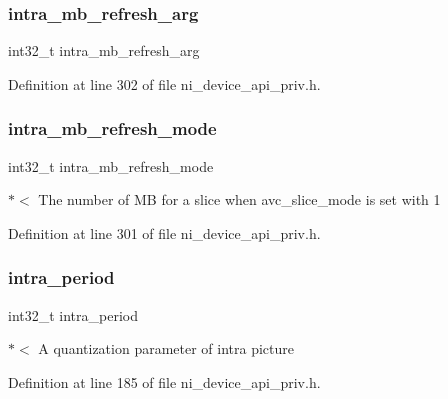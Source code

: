\subsubsection{\texorpdfstring{intra\_mb\_refresh\_arg}{intra\_mb\_refresh\_arg}}
{\footnotesize\ttfamily int32\+\_\+t intra\+\_\+mb\+\_\+refresh\+\_\+arg}



Definition at line 302 of file ni\+\_\+device\+\_\+api\+\_\+priv.\+h.

\mbox{\label{struct__ni__t408__config__t_a3058fa56db32c1a7a7377990f8a4f01a}} 
\subsubsection{\texorpdfstring{intra\_mb\_refresh\_mode}{intra\_mb\_refresh\_mode}}
{\footnotesize\ttfamily int32\+\_\+t intra\+\_\+mb\+\_\+refresh\+\_\+mode}

$\ast$$<$ The number of MB for a slice when avc\+\_\+slice\+\_\+mode is set with 1 

Definition at line 301 of file ni\+\_\+device\+\_\+api\+\_\+priv.\+h.

\mbox{\label{struct__ni__t408__config__t_ac5dad8bef407cf664f56517a7b39e424}} 
\subsubsection{\texorpdfstring{intra\_period}{intra\_period}}
{\footnotesize\ttfamily int32\+\_\+t intra\+\_\+period}

$\ast$$<$ A quantization parameter of intra picture 

Definition at line 185 of file ni\+\_\+device\+\_\+api\+\_\+priv.\+h.

\mbox{\label{struct__ni__t408__config__t_a02161a1953a870e2b5dcf24c1bef3d10}} 
